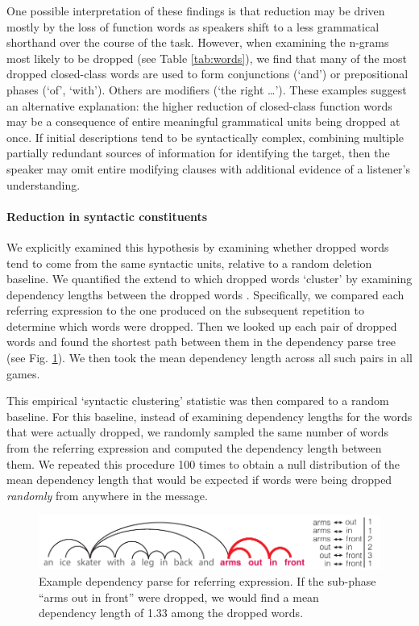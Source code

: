 \documentclass[alpha-refs]{wiley-article}
\begin{document}
One possible interpretation of these findings is that reduction may be driven mostly by the loss of function words as speakers shift to a less grammatical shorthand over the course of the task.
However, when examining the n-grams most likely to be dropped (see Table \ref{tab:words}), we find that many of the most dropped closed-class words are used to form conjunctions (`and') or prepositional phases (`of', `with').
Others are modifiers (`the right \dots'). 
These examples suggest an alternative explanation: the higher reduction of closed-class function words may be a consequence of entire meaningful grammatical units being dropped at once.
If initial descriptions tend to be syntactically complex, combining multiple partially redundant sources of information for identifying the target, then the speaker may omit entire modifying clauses with additional evidence of a listener's understanding.

\paragraph{Reduction in syntactic constituents} 
We explicitly examined this hypothesis by examining whether dropped words tend to come from the same syntactic units, relative to a random deletion baseline.
We quantified the extend to which dropped words `cluster' by examining dependency lengths between the dropped words \citep{jurafsky2014speech,futrell2015large}.
Specifically, we compared each referring expression to the one produced on the subsequent repetition to determine which words were dropped.
Then we looked up each pair of dropped words and found the shortest path between them in the dependency parse tree (see Fig. \ref{fig:dependency}).
We then took the mean dependency length across all such pairs in all games.

This empirical `syntactic clustering' statistic was then compared to a random baseline.
For this baseline, instead of examining dependency lengths for the words that were actually dropped, we randomly sampled the same number of words from the referring expression and computed the dependency length between them.
We repeated this procedure 100 times to obtain a null distribution of the mean dependency length that would be expected if words were being dropped \emph{randomly} from anywhere in the message.

\begin{figure}[t!]
\centering
\includegraphics[scale=.8]{dependency.pdf}
\caption{Example dependency parse for referring expression. If the sub-phase ``arms out in front'' were dropped, we would find a mean dependency length of 1.33 among the dropped words.} 
\label{fig:dependency}
\end{figure}
\end{document}

